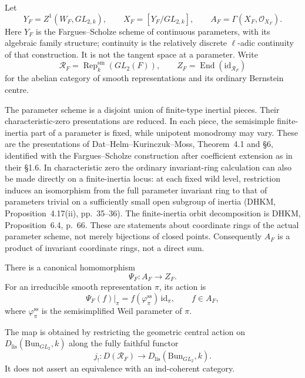 Let
\[
 Y_F=Z^1(W_F,GL_{2,k}),\qquad
 X_F=[Y_F/GL_{2,k}],\qquad
 A_F=\Gamma(X_F,\mathcal O_{X_F}).
\]
Here \(Y_F\) is the Fargues--Scholze scheme of continuous
parameters, with its algebraic family structure; continuity is
the relatively discrete \(\ell\)-adic continuity of that
construction. It is not the tangent space at a parameter.
Write
\[
 \mathcal R_F=\operatorname{Rep}^{\mathrm{sm}}_k(GL_2(F)),
 \qquad Z_F=\operatorname{End}(\mathrm{id}_{\mathcal R_F})
\]
for the abelian category of smooth representations and its
ordinary Bernstein centre.

The parameter scheme is a disjoint union of finite-type
inertial pieces. Their characteristic-zero presentations are
reduced. In each piece, the semisimple finite-inertia part of
a parameter is fixed, while unipotent monodromy may vary.
These are the presentations of
Dat--Helm--Kurinczuk--Moss, Theorem~4.1 and \S6, identified with
the Fargues--Scholze construction after coefficient extension
as in their \S1.6. In characteristic zero the ordinary invariant-ring calculation can
also be made directly on a finite-inertia locus: at each fixed wild
level, restriction induces an isomorphism from the full parameter
invariant ring to that of parameters trivial on a sufficiently small
open subgroup of inertia (DHKM, Proposition~4.17(ii), pp.~35--36).
The finite-inertia orbit decomposition is DHKM, Proposition~6.4,
p.~66. These are statements about coordinate rings of the actual
parameter scheme, not merely bijections of closed points.
Consequently $A_F$ is a product of invariant coordinate rings,
not a direct sum.

\begin{theorem}
\label{v4-arith:w10-e:thm:fs-spectral}
\ClaimStatusProvedElsewhere
There is a canonical homomorphism
\begin{equation}
 \Psi_F:A_F\longrightarrow Z_F.
 \label{v4-arith:w10-e:eq:fs-excursion}
\end{equation}
For an irreducible smooth representation \(\pi\), its action is
\[
 \Psi_F(f)|_\pi=f(\varphi_\pi^{\mathrm{ss}})\,\mathrm{id}_\pi,
 \qquad f\in A_F,
\]
where \(\varphi_\pi^{\mathrm{ss}}\) is the semisimplified
Weil parameter of \(\pi\).

The map is obtained by restricting the geometric central
action on \(D_{\mathrm{lis}}(\mathrm{Bun}_{GL_2},k)\) along
the fully faithful functor
\[
 j_!:D(\mathcal R_F)\longrightarrow
 D_{\mathrm{lis}}(\mathrm{Bun}_{GL_2},k).
\]
It does not assert an equivalence with an ind-coherent category.
\end{theorem}

